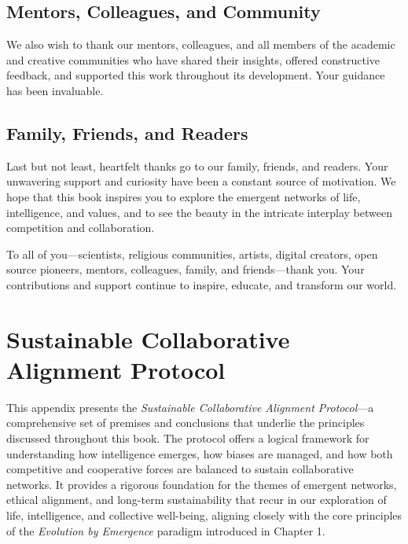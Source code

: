 \documentclass[12pt,openany]{book}
\let\cleardoublepage\clearpage %
\begin{document}
\section*{Mentors, Colleagues, and Community}
We also wish to thank our mentors, colleagues, and all members of the academic and creative communities who have shared their insights, offered constructive feedback, and supported this work throughout its development. Your guidance has been invaluable.

\section*{Family, Friends, and Readers}
Last but not least, heartfelt thanks go to our family, friends, and readers. Your unwavering support and curiosity have been a constant source of motivation. We hope that this book inspires you to explore the emergent networks of life, intelligence, and values, and to see the beauty in the intricate interplay between competition and collaboration.

\bigskip
To all of you—scientists, religious communities, artists, digital creators, open source pioneers, mentors, colleagues, family, and friends—thank you. Your contributions and support continue to inspire, educate, and transform our world.
\cleardoublepage

\appendix %
\chapter{Sustainable Collaborative Alignment Protocol}
\label{app:SCAP}

This appendix presents the \emph{Sustainable Collaborative Alignment Protocol}—a comprehensive set of premises and conclusions that underlie the principles discussed throughout this book. The protocol offers a logical framework for understanding how intelligence emerges, how biases are managed, and how both competitive and cooperative forces are balanced to sustain collaborative networks. It provides a rigorous foundation for the themes of emergent networks, ethical alignment, and long-term sustainability that recur in our exploration of life, intelligence, and collective well-being, aligning closely with the core principles of the \emph{Evolution by Emergence} paradigm introduced in Chapter 1. %
\end{document}
